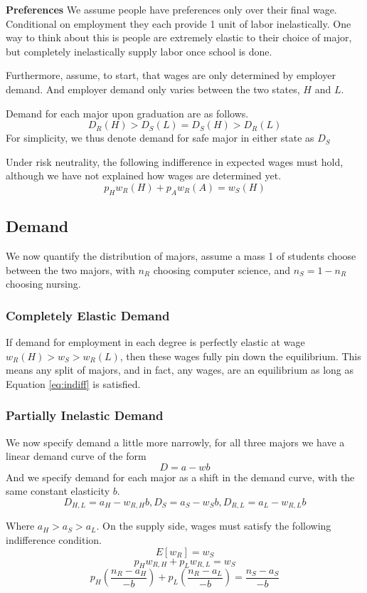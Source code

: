 \documentclass[12pt]{article}
\begin{document}
\textbf{Preferences}
We assume people have preferences only over their final wage.  Conditional on employment they each provide 1 unit of labor inelastically. One way to think about this is people are extremely elastic to their choice of major, but completely inelastically supply labor once school is done. 

Furthermore, assume, to start, that wages are only determined by employer demand. And employer demand only varies between the two states, $H$ and $L$.


Demand for each major upon graduation are as follows. 
$$ D_R(H) > D_S(L) = D_S(H) > D_R(L)  $$
For simplicity, we thus denote demand for safe major in either state as $D_S$


Under risk neutrality, the following indifference in expected wages must hold, although we have not explained how wages are determined yet. 
\begin{equation}
   p_H w_R(H) + p_A w_R(A) = w_S(H)
   \label{eqn:indiff}
\end{equation}


\subsection{Demand}
We now quantify the distribution of majors, assume a mass 1 of students choose between the two majors, with $n_R$ choosing computer science, and $n_S = 1-n_R$ choosing nursing.

\subsubsection{Completely Elastic Demand}
If demand for employment in each degree is perfectly elastic at wage $w_R(H) > w_S > w_R(L)$, then these wages fully pin down the equilibrium.  This means any split of majors, and in fact, any wages, are an equilibrium as long as Equation \ref{eq:indiff} is satisfied.


 \subsubsection{Partially Inelastic Demand}
We now specify demand a little more narrowly, for all three majors we have a linear demand curve of the form
$$D = a - wb $$
And we specify demand for each major as a shift in the demand curve, with the same constant elasticity $b$.
$$ D_{H,L}  = a_H - w_{R,H}b ,  D_S =   a_S - w_{S}b  , D_{R,L}   =  a_L - w_{R,L} b  $$

Where $a_H > a_S > a_L$.
On the supply side, wages must satisfy the following indifference condition.
$$ E[w_R] = w_S   $$
$$ p_H w_{R,H} + p_L w_{R,L}  = w_S   $$
$$ p_H(\frac{n_R - a_H}{-b})  + p_L(\frac{n_R - a_L}{-b}) = \frac{n_S-a_S}{-b}   $$
\end{document}
